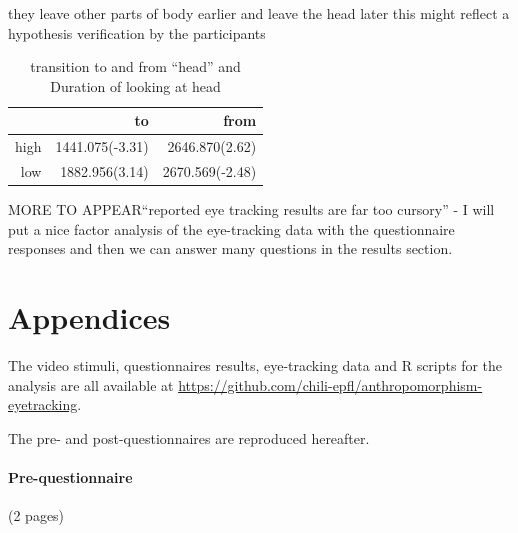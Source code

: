 \documentclass[lettersize, noapacite, twoside, HRI]{apa_HRI}
\begin{document}
they leave other parts of body earlier and leave the head later this might reflect a hypothesis verification by the participants

\begin{table}[ht]
\caption{transition to and from ``head'' and Duration of looking at head}
\centering
\begin{tabular}{rrr}
  \hline
 & to & from \\ 
  \hline
high & 1441.075(-3.31) & 2646.870(2.62) \\ 
  low & 1882.956(3.14) & 2670.569(-2.48) \\ 
   \hline
\end{tabular}
\end{table}




MORE TO APPEAR``reported eye tracking results are far too cursory'' - I will put
a nice factor analysis of the eye-tracking data with the questionnaire responses
and then we can answer many questions in the results section. 




\pagebreak
\appendix

\section{Appendices}

The video stimuli, questionnaires results, eye-tracking data and R scripts for
the analysis are all available at
\url{https://github.com/chili-epfl/anthropomorphism-eyetracking}.

The pre- and post-questionnaires are reproduced hereafter.
\vfill
\pagebreak
\paragraph{Pre-questionnaire} (2 pages)
\end{document}
